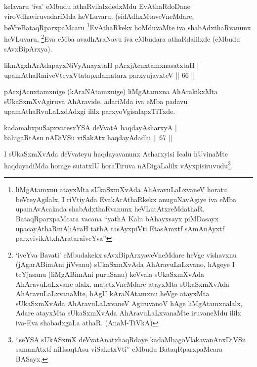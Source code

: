 \begin{artha}
kelavaru `iva' eMbudu athaRvilalxdedxMdu EvAthaRdoDane viroVdhaviruvadariMda heVLuvaru. (sidAdhxMtaveVneMdare, beVre\break BataqRparxpaMcaru \footnote{liMgAtamxnu atayxMta sUkaSxmXvAda AhAravuLaLxvaneV horatu beVreyAgilalx, I riVtiyAda EvakArAthaRkekx anuguNavAgiye iva eMba upamAvAcakada shabAdxthaRvanunx heVLutAtxreMdathaR. BataqRparxpaMcara vacana \mdash ``yathA Kalu bAhayxsayx piMDasayx upacayAthaRmAhAraH tathA tasAyxpiVti EtasAmxtf sAmAnAyxtf parxvivikAtxhArataraiveYva''}EvAthaRkekx hoMduvaMte iva shabAdxthaRvanunx heVLuvaru, \footnote{`iveYva Bavati' eMbudakekx sAvxBipArxyaveVneMdare heVge vishavxnu (jAgarABimAni jiVvanu) sUkaSxmXvAda AhAravuLaLxvano, hAgeye I teYjasanu (liMgABimAni puruSanu) keVvala sUkaSxmXvAda AhAravuLaLxvane alalx. matetxVneMdare atayxMta sUkaSxmXvAda AhAravuLaLxvanaMte, hAgU kAraNAtamxnu heVge atayxMta sUkaSxmXvAda AhAravuLaLxvaneV AgiruvanoV hAge liMgAtamxnalalx, Adare atayxMta sUkaSxmXvAda AhAravuLaLxvanaMte iruvaneMdu ililx iva-Eva shabadxgaLa athaR. (AnaM-TiVkA)}Eva eMba avadhAraNavu iva eMbudara athaRdalilxde (eMbudu sAvxBipArxya).
\end{artha}


\begin{shl}
liknAgxhArAdapayxNiVyAnayxtaH pArxjAcnxtamxnasatxtaH |\\
upamAthaRmiveVteyxVtatapxdamatarx parxyujayxteV \hfill || 66 || 
\end{shl}

\begin{artha}
pArxjAcnxtamxnige (kAraNAtamxnige) liMgAtamxna AhArakikxMta sUkaSxmXvAgiruva AhAravide. adariMda iva eMba padavu upamAthaRvuLaLxdAdxgi ililx parxyoVgisalapxTiTxde.
\end{artha}


\begin{shl}
kadamabxpuSapxvatesxYSA deVvatA haqdayAsharxyA |\\
bahigaRtAsu nADiVSu viSakAtx haqdayAdadhi \hfill || 67 || 
\end{shl}

\begin{artha}
I sUkaSxmXvAda deVvateyu haqdayavanunx Asharxyisi Icalu hUvinaMte haqdayadiMda horage sutatxlU horaTiruva nADigaLalilx vAyxpisiruvudu\footnote{``seYSA sUkASxmX deVvatA\s natxhaqRdaye kadaMbagoVlakavanAnxDiVSu samanAtxtf niHsaqtAsu viSaketxVti'' eMbudu BataqRparxpaMcara BASayx.}.
\end{artha}

